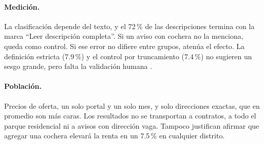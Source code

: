 \paragraph{Medición.} La clasificación depende del texto, y el 72\,\% de las descripciones termina con la marca ``Leer descripción completa''. Si un aviso con cochera no la menciona, queda como control. Si ese error no difiere entre grupos, atenúa el efecto. La definición estricta (7.9\,\%) y el control por truncamiento (7.4\,\%) no sugieren un sesgo grande, pero falta la validación humana \citep{egami2023}.

\paragraph{Población.} Precios de oferta, un solo portal y un solo mes, y solo direcciones exactas, que en promedio son más caras. Los resultados no se transportan a contratos, a todo el parque residencial ni a avisos con dirección vaga. Tampoco justifican afirmar que agregar una cochera elevará la renta en un 7.5\,\% en cualquier distrito.
